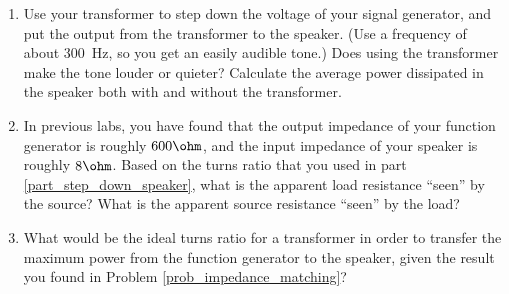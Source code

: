 \begin{enumerate}

\item Use your transformer to step down the voltage of your signal generator, and put the output from the transformer to the speaker.  (Use a frequency of about 300~Hz, so you get an easily audible tone.)  Does using the transformer make the tone louder or quieter?  Calculate the average power dissipated in the speaker both with and without the transformer.
\label{part_step_down_speaker}

\item In previous labs, you have found that the output impedance of your function generator is roughly $600\ohm$, and the input impedance of your speaker is roughly $8\ohm$.  
Based on the turns ratio that you used in part \ref{part_step_down_speaker}, what is the apparent load resistance ``seen'' by the source?  What is the apparent source resistance ``seen'' by the load?

\item What would be the ideal turns ratio for a transformer in order to transfer the maximum power from the function generator to the speaker, given the result you found in Problem \ref{prob_impedance_matching}?

\end{enumerate}

